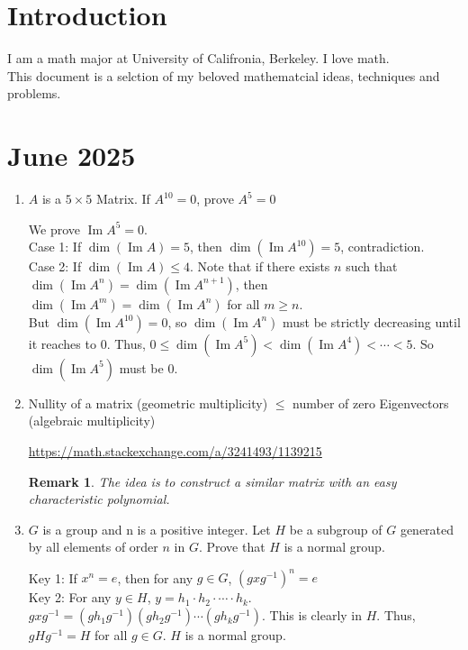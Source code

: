 \documentclass{article}
\DeclareMathOperator{\Ima}{Im}
\newenvironment{solution}{
  \begin{tcolorbox}[mysolutionbox]
}{
  \end{tcolorbox}
}
\newtheorem{remark}[theorem]{Remark}
\begin{document}
\section*{Introduction}
I am a math major at University of Califronia, Berkeley. I love math. 
\\
This document is a selction of my beloved mathematcial ideas, techniques and problems. 
\section{June 2025}
\begin{enumerate}
    \item $A$ is a $5 \times 5 $ Matrix. If $A^{10}=0$, prove $A^5=0$
    \begin{solution}
        We prove $\Ima A^5=0$.
        \\
        
        Case 1: If $\dim (\Ima A)=5$, then $\dim (\Ima A^{10})=5$, contradiction. 
        \\
        
        Case 2: If $\dim (\Ima A)\leq 4$. Note that if there exists $n$ such that $\dim (\Ima A^n)=\dim (\Ima A^{n+1})$, then $\dim (\Ima A^m)=\dim (\Ima A^{n})$ for all $m\geq n$. 
        \\
        But $\dim (\Ima A^{10})=0$, so $\dim (\Ima A^{n})$ must be strictly decreasing until it reaches to $0$. Thus, $0\le\dim (\Ima A^{5})<\dim (\Ima A^{4})<\cdots <5$. So $\dim (\Ima A^{5})$ must be $0$. 
    \end{solution}
    
    \item Nullity of a matrix (geometric multiplicity)  $\leq$ number of zero Eigenvectors (algebraic multiplicity)
    \begin{solution}
    \href{https://math.stackexchange.com/a/3241493/1139215}{https://math.stackexchange.com/a/3241493/1139215}
    \end{solution}
    \begin{remark}
        The idea is to construct a similar matrix with an easy characteristic  polynomial.
    \end{remark}
    \item $G$ is a group and n is a positive integer. Let $H$ be a subgroup of $G$ generated by all elements of order $n$ in $G$. Prove that $H$ is a normal group. 
    \begin{solution}
    Key 1: If $x^n=e$, then for any $g \in G$, $(gxg^{-1})^n=e$
    \\
    Key 2: For any $y \in H$, $y=h_1 \cdot h_2 \cdot \cdots \cdot h_k$. $gxg^{-1}=(gh_1g^{-1})(gh_2g^{-1}) \cdots (gh_kg^{-1})$. This is clearly in $H$. Thus, $gHg^{-1}=H$ for all $g \in G$. $H$ is a normal group. 
    \end{solution}
    \end{enumerate}
\end{document}
